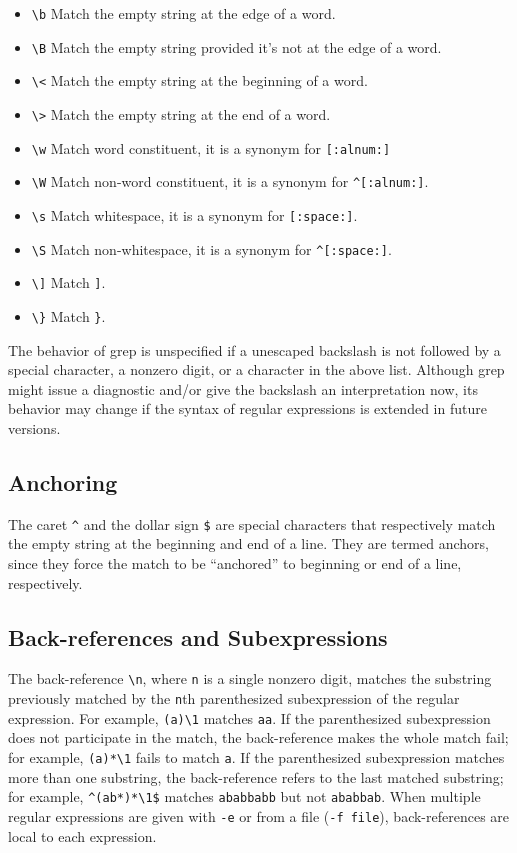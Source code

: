 \begin{itemize}
\item \verb+\b+ Match the empty string at the edge of a word.
\item \verb+\B+ Match the empty string provided it’s not at the edge of a word.
\item \verb+\<+ Match the empty string at the beginning of a word.
\item \verb+\>+ Match the empty string at the end of a word.
\item \verb+\w+ Match word constituent, it is a synonym for \verb+[:alnum:]+
\item \verb+\W+ Match non-word constituent, it is a synonym for \verb+^[:alnum:]+.
\item \verb+\s+ Match whitespace, it is a synonym for \verb+[:space:]+.
\item \verb+\S+ Match non-whitespace, it is a synonym for \verb+^[:space:]+.
\item \verb+\]+ Match \verb+]+.
\item \verb+\}+ Match \verb+}+.
\end{itemize}

The behavior of grep is unspecified if a unescaped backslash is not followed by
a special character, a nonzero digit, or a character in the above list.
Although grep might issue a diagnostic and/or give the backslash an
interpretation now, its behavior may change if the syntax of regular
expressions is extended in future versions. 

\subsection{Anchoring}

The caret \verb+^+ and the dollar sign \verb+$+ are special characters that
respectively match the empty string at the beginning and end of a line. They
are termed anchors, since they force the match to be “anchored” to beginning or
end of a line, respectively. 

\subsection{Back-references and Subexpressions}

The back-reference \verb+\n+, where \verb+n+ is a single nonzero digit, matches
the substring previously matched by the \verb+n+th parenthesized subexpression
of the regular expression. For example, \verb+(a)\1+ matches \verb+aa+. If the
parenthesized subexpression does not participate in the match, the
back-reference makes the whole match fail; for example, \verb+(a)*\1+ fails to
match \verb+a+. If the parenthesized subexpression matches more than one
substring, the back-reference refers to the last matched substring; for
example, \verb+^(ab*)*\1$+ matches \verb+ababbabb+ but not \verb+ababbab+. When
multiple regular expressions are given with \verb+-e+ or from a file 
(\verb+-f file+), back-references are local to each expression. 


